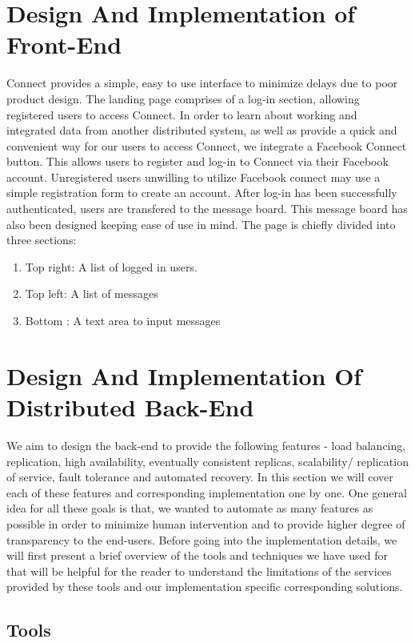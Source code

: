 \documentclass[12pt]{article}
\begin{document}
\section {Design And Implementation of Front-End} 
Connect provides a simple, easy to use interface to minimize delays due to poor product design. 
The landing page comprises of a log-in section, allowing registered users to access Connect. In
order to learn about working and integrated data from another distributed
system, as well as provide a quick and convenient way for our users to access
Connect, we integrate a Facebook Connect button. This allows users to register
and log-in to Connect via their Facebook account. Unregistered users unwilling
to utilize Facebook connect may use a simple registration form to create an
account.  After log-in has been successfully authenticated, users are transfered
to the message board. This message board has also been designed keeping ease of
use in mind. The page is chiefly divided into three sections: 

\begin{enumerate}
\item Top right: A list of logged in users.  
\item Top left: A list of messages
\item Bottom : A text area to input messages 
\end{enumerate} 

\section {Design And Implementation Of Distributed Back-End} 
We aim to design the back-end to provide the following features - load balancing, 
replication, high availability, eventually consistent replicas, scalability/
replication of service, fault tolerance and automated recovery. 
In this section we will cover each of these features and corresponding implementation 
one by one. One general idea for all these goals is that, we wanted to automate as many 
features as possible in order to minimize human intervention and to provide higher degree of 
transparency to the end-users. Before going into the implementation details, we will first
present a brief overview of the tools and techniques we have used for that will
be helpful for the reader to understand the limitations of the services provided
by these tools and our implementation specific corresponding solutions.

\subsection{Tools} 
\end{document}
